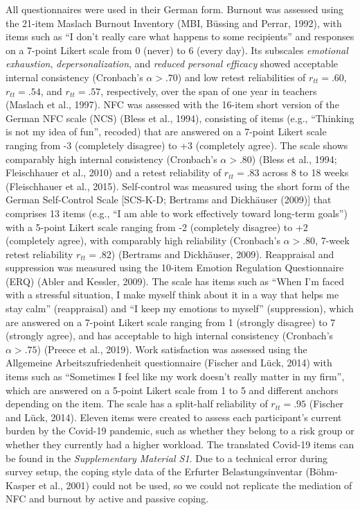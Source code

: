 \documentclass[
  english,
  man,floatsintext]{apa6}
\begin{document}
All questionnaires were used in their German form.
Burnout was assessed using the 21-item Maslach Burnout Inventory (MBI, Büssing and Perrar, 1992), with items such as ``I don't really care what happens to some recipients'' and responses on a 7-point Likert scale from 0 (never) to 6 (every day).
Its subscales \emph{emotional exhaustion}, \emph{depersonalization}, and \emph{reduced personal efficacy} showed acceptable internal consistency (Cronbach's \(\alpha>.70\)) and low retest reliabilities of \(r_{tt}=.60\), \(r_{tt}=.54\), and \(r_{tt}=.57\), respectively, over the span of one year in teachers (Maslach et al., 1997).
NFC was assessed with the 16-item short version of the German NFC scale (NCS) (Bless et al., 1994), consisting of items (e.g., ``Thinking is not my idea of fun'', recoded) that are answered on a 7-point Likert scale ranging from -3 (completely disagree) to +3 (completely agree).
The scale shows comparably high internal consistency (Cronbach's \(\alpha>.80\)) (Bless et al., 1994; Fleischhauer et al., 2010) and a retest reliability of \(r_{tt}=.83\) across 8 to 18 weeks (Fleischhauer et al., 2015).
Self-control was measured using the short form of the German Self-Control Scale {[}SCS-K-D; Bertrams and Dickhäuser (2009){]} that comprises 13 items (e.g., ``I am able to work effectively toward long-term goals'') with a 5-point Likert scale ranging from -2 (completely disagree) to +2 (completely agree), with comparably high reliability (Cronbach's \(\alpha>.80\), 7-week retest reliability \(r_{tt}=.82\)) (Bertrams and Dickhäuser, 2009).
Reappraisal and suppression was measured using the 10-item Emotion Regulation Questionnaire (ERQ) (Abler and Kessler, 2009).
The scale has items such as ``When I'm faced with a stressful situation, I make myself think about it in a way that helps me stay calm'' (reappraisal) and ``I keep my emotions to myself'' (suppression), which are answered on a 7-point Likert scale ranging from 1 (strongly disagree) to 7 (strongly agree), and has acceptable to high internal consistency (Cronbach's \(\alpha>.75\)) (Preece et al., 2019).
Work satisfaction was assessed using the Allgemeine Arbeitszufriedenheit questionnaire (Fischer and Lück, 2014) with items such as ``Sometimes I feel like my work doesn't really matter in my firm'', which are answered on a 5-point Likert scale from 1 to 5 and different anchors depending on the item.
The scale has a split-half reliability of \(r_{tt}=.95\) (Fischer and Lück, 2014).
Eleven items were created to assess each participant's current burden by the Covid-19 pandemic, such as whether they belong to a risk group or whether they currently had a higher workload.
The translated Covid-19 items can be found in the \emph{Supplementary Material S1}.
Due to a technical error during survey setup, the coping style data of the Erfurter Belastungsinventar (Böhm-Kasper et al., 2001) could not be used, so we could not replicate the mediation of NFC and burnout by active and passive coping.
\end{document}
